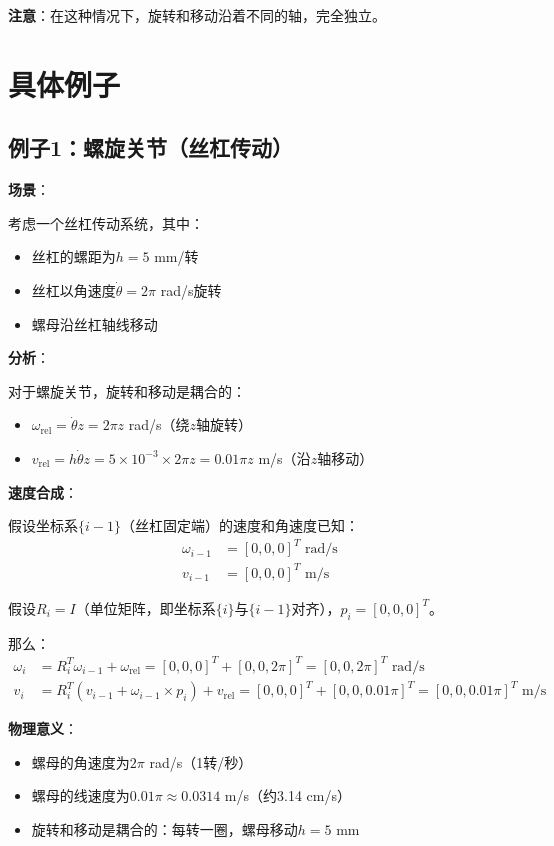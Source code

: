 \documentclass[12pt,a4paper]{article}
\begin{document}
\textbf{注意}：在这种情况下，旋转和移动沿着不同的轴，完全独立。

\section{具体例子}

\subsection{例子1：螺旋关节（丝杠传动）}

\textbf{场景}：

考虑一个丝杠传动系统，其中：
\begin{itemize}
\item 丝杠的螺距为$h = 5$ mm/转
\item 丝杠以角速度$\dot{\theta} = 2\pi$ rad/s旋转
\item 螺母沿丝杠轴线移动
\end{itemize}

\textbf{分析}：

对于螺旋关节，旋转和移动是耦合的：
\begin{itemize}
\item $\omega_{\text{rel}} = \dot{\theta} z = 2\pi z$ rad/s（绕$z$轴旋转）
\item $v_{\text{rel}} = h \dot{\theta} z = 5 \times 10^{-3} \times 2\pi z = 0.01\pi z$ m/s（沿$z$轴移动）
\end{itemize}

\textbf{速度合成}：

假设坐标系$\{i-1\}$（丝杠固定端）的速度和角速度已知：
\begin{align}
\omega_{i-1} &= [0, 0, 0]^T \text{ rad/s} \\
v_{i-1} &= [0, 0, 0]^T \text{ m/s}
\end{align}

假设$R_i = I$（单位矩阵，即坐标系$\{i\}$与$\{i-1\}$对齐），$p_i = [0, 0, 0]^T$。

那么：
\begin{align}
\omega_i &= R_i^T \omega_{i-1} + \omega_{\text{rel}} = [0, 0, 0]^T + [0, 0, 2\pi]^T = [0, 0, 2\pi]^T \text{ rad/s} \\
v_i &= R_i^T (v_{i-1} + \omega_{i-1} \times p_i) + v_{\text{rel}} = [0, 0, 0]^T + [0, 0, 0.01\pi]^T = [0, 0, 0.01\pi]^T \text{ m/s}
\end{align}

\textbf{物理意义}：
\begin{itemize}
\item 螺母的角速度为$2\pi$ rad/s（1转/秒）
\item 螺母的线速度为$0.01\pi \approx 0.0314$ m/s（约3.14 cm/s）
\item 旋转和移动是耦合的：每转一圈，螺母移动$h = 5$ mm
\end{itemize}
\end{document}
